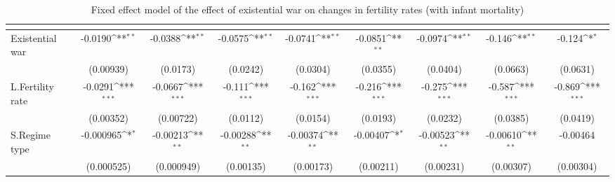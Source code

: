 \begin{table}[htbp]\centering
\def\sym#1{\ifmmode^{#1}\else\(^{#1}\)\fi}
\caption{Fixed effect model of the effect of existential war on changes in fertility rates (with infant mortality) \label{fefertilityinfant}}
\begin{tabular}{l*{8}{c}}
\hline\hline
                    &&&&&&&&\\
\hline
Existential war     &     -0.0190\sym{**} &     -0.0388\sym{**} &     -0.0575\sym{**} &     -0.0741\sym{**} &     -0.0851\sym{**} &     -0.0974\sym{**} &      -0.146\sym{**} &      -0.124\sym{*}  \\
                    &   (0.00939)         &    (0.0173)         &    (0.0242)         &    (0.0304)         &    (0.0355)         &    (0.0404)         &    (0.0663)         &    (0.0631)         \\
[1em]
L.Fertility rate    &     -0.0291\sym{***}&     -0.0667\sym{***}&      -0.111\sym{***}&      -0.162\sym{***}&      -0.216\sym{***}&      -0.275\sym{***}&      -0.587\sym{***}&      -0.869\sym{***}\\
                    &   (0.00352)         &   (0.00722)         &    (0.0112)         &    (0.0154)         &    (0.0193)         &    (0.0232)         &    (0.0385)         &    (0.0419)         \\
[1em]
S.Regime type       &   -0.000965\sym{*}  &    -0.00213\sym{**} &    -0.00288\sym{**} &    -0.00374\sym{**} &    -0.00407\sym{*}  &    -0.00523\sym{**} &    -0.00610\sym{**} &    -0.00464         \\
                    &  (0.000525)         &  (0.000949)         &   (0.00135)         &   (0.00173)         &   (0.00211)         &   (0.00231)         &   (0.00307)         &   (0.00304)         \\
[1em]

\end{tabular}
\end{table}
